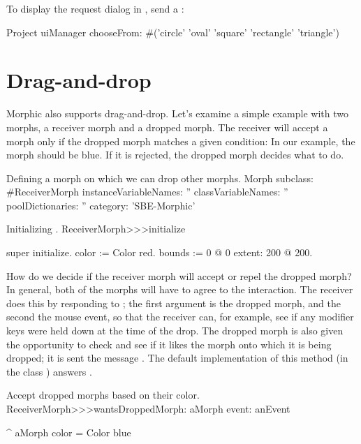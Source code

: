 \documentclass[a4paper,10pt,twoside]{book}
\begin{document}
To display the request dialog in , send a :
\begin{code}{}
Project uiManager
	chooseFrom: #('circle' 'oval' 'square' 'rectangle' 'triangle')
\end{code}

\section{Drag-and-drop}

Morphic also supports drag-and-drop.
Let's examine a simple example with two morphs, a receiver morph and a dropped morph.
The receiver will accept a morph only if the dropped morph matches a given condition:
In our example, the morph should be blue.
If it is rejected, the dropped morph decides what to do.

\begin{classdef}{Defining a morph on which we can drop other morphs.}
Morph subclass: #ReceiverMorph
	instanceVariableNames: ''
	classVariableNames: ''
	poolDictionaries: ''
	category: 'SBE-Morphic'
\end{classdef}

\begin{method}{Initializing .}
ReceiverMorph>>>initialize

	super initialize.
	color := Color red.
	bounds := 0 @ 0 extent: 200 @ 200.
\end{method}

How do we decide if the receiver morph will accept or repel the dropped morph?
In general, both of the morphs will have to agree to the interaction.
The receiver does this by responding to ; the first argument is the dropped morph, and the second the mouse event, so that the receiver can, for example, see if any modifier keys were held down at the time of the drop.
The dropped morph is also given the opportunity to check and see if it likes the morph onto which it is being dropped; it is sent the message .
The default implementation of this method (in the class ) answers .

\begin{method}{Accept dropped morphs based on their color.}
ReceiverMorph>>>wantsDroppedMorph: aMorph event: anEvent

	^ aMorph color = Color blue
\end{method}
\end{document}

